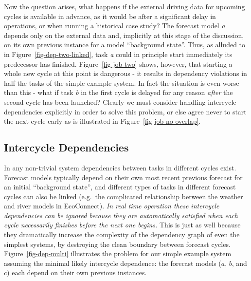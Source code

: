 \documentclass[11pt,a4paper]{article}
\begin{document}
Now the question arises, what happens if the external driving data for
upcoming cycles is available in advance, as it would be after a
significant delay in operations, or when running a historical case
study?  The forecast model {\em a} depends only on the external data
and, implicitly at this stage of the discussion, on its own previous
instance for a model ``background state''. Thus, as alluded to in
Figure~\ref{fig-dep-two-linked}, task {\em a} could in principle start
immediately its predecessor has finished.  Figure~\ref{fig-job-two}
shows, however, that starting a whole new cycle at this point is
dangerous - it results in dependency violations in half the tasks of the
simple example system. In fact the situation is even worse than this -
what if task {\em b} in the first cycle is delayed for any reason {\em
after} the second cycle has been launched? Clearly we must consider
handling intercycle dependencies explicitly in order to solve this
problem, or else agree never to start the next cycle early as
is illustrated in Figure~\ref{fig-job-no-overlap}.


\subsection{Intercycle Dependencies} 
\label{IntercycleDependencies}

In any non-trivial system dependencies between tasks in different cycles
exist. Forecast models typically depend on their own most recent
previous forecast for an initial ``background state'', and different
types of tasks in different forecast cycles can also be linked (e.g.\
the complicated relationship between the weather and river models in
EcoConnect). {\em In real time operation these intercycle dependencies
can be ignored because they are automatically satisfied when each cycle
necessarily finishes before the next one begins.} This is just as well
because they dramatically increase the complexity of the dependency
graph of even the simplest systems, by destroying the clean boundary
between forecast cycles. Figure~\ref{fig-dep-multi} illustrates the
problem for our simple example system assuming the minimal likely
intercycle dependence: the forecast models ($a$, $b$, and $c$) each
depend on their own previous instances.
\end{document}
